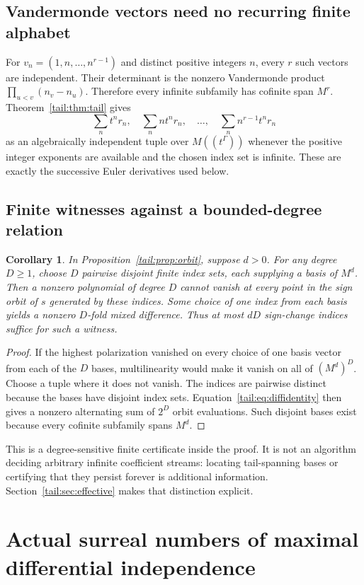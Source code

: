 \documentclass[11pt,a4paper]{article}
\numberwithin{equation}{section}
\newtheorem{corollary}[theorem]{Corollary}
\theoremstyle{definition}
\theoremstyle{remark}
\begin{document}
\subsection{Vandermonde vectors need no recurring finite alphabet}
For $v_n=(1,n,\ldots,n^{r-1})$ and distinct positive integers $n$, every
$r$ such vectors are independent. Their determinant is the nonzero
Vandermonde product $\prod_{u<v}(n_v-n_u)$. Therefore every infinite
subfamily has cofinite span $M^r$. Theorem~\ref{tail:thm:tail} gives
\[
 \sum_n t^nr_n,\quad
 \sum_n nt^nr_n,\quad\ldots,\quad
 \sum_n n^{r-1}t^nr_n
\]
as an algebraically independent tuple over $M((t^\Gamma))$ whenever the
positive integer exponents are available and the chosen index set is
infinite. These are exactly the successive Euler derivatives used below.

\subsection{Finite witnesses against a bounded-degree relation}
\begin{corollary}\label{tail:cor:finitewitness}
In Proposition~\ref{tail:prop:orbit}, suppose $d>0$. For any degree $D\geq1$,
choose $D$ pairwise disjoint finite index sets, each supplying a basis of
$M^d$. Then a nonzero polynomial of degree $D$ cannot vanish at every
point in the sign orbit of $s$ generated by these indices. Some choice
of one index from each basis yields a nonzero $D$-fold mixed difference.
Thus at most $dD$ sign-change indices suffice for such a witness.
\end{corollary}
\begin{proof}
If the highest polarization vanished on every choice of one basis vector
from each of the $D$ bases, multilinearity would make it vanish on all of
$(M^d)^D$. Choose a tuple where it does not vanish. The indices are
pairwise distinct because the bases have disjoint index sets.
Equation~\eqref{tail:eq:diffidentity} then gives a nonzero alternating sum of
$2^D$ orbit evaluations. Such disjoint bases exist because every cofinite
subfamily spans $M^d$.
\end{proof}

This is a degree-sensitive finite certificate inside the proof. It is not
an algorithm deciding arbitrary infinite coefficient streams: locating
tail-spanning bases or certifying that they persist forever is additional
information. Section~\ref{tail:sec:effective} makes that distinction explicit.

\section{Actual surreal numbers of maximal differential independence}\label{tail:sec:surreal}
\end{document}
